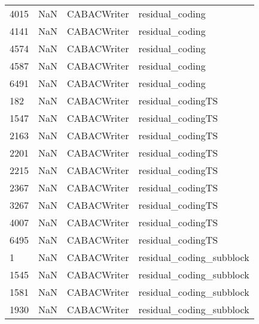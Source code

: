 \begin{tabular}{llll}
4015 &                   NaN &                CABACWriter &                           residual\_coding \\
4141 &                   NaN &                CABACWriter &                           residual\_coding \\
4574 &                   NaN &                CABACWriter &                           residual\_coding \\
4587 &                   NaN &                CABACWriter &                           residual\_coding \\
6491 &                   NaN &                CABACWriter &                           residual\_coding \\
182  &                   NaN &                CABACWriter &                         residual\_codingTS \\
1547 &                   NaN &                CABACWriter &                         residual\_codingTS \\
2163 &                   NaN &                CABACWriter &                         residual\_codingTS \\
2201 &                   NaN &                CABACWriter &                         residual\_codingTS \\
2215 &                   NaN &                CABACWriter &                         residual\_codingTS \\
2367 &                   NaN &                CABACWriter &                         residual\_codingTS \\
3267 &                   NaN &                CABACWriter &                         residual\_codingTS \\
4007 &                   NaN &                CABACWriter &                         residual\_codingTS \\
6495 &                   NaN &                CABACWriter &                         residual\_codingTS \\
1    &                   NaN &                CABACWriter &                  residual\_coding\_subblock \\
1545 &                   NaN &                CABACWriter &                  residual\_coding\_subblock \\
1581 &                   NaN &                CABACWriter &                  residual\_coding\_subblock \\
1930 &                   NaN &                CABACWriter &                  residual\_coding\_subblock \\

\end{tabular}
